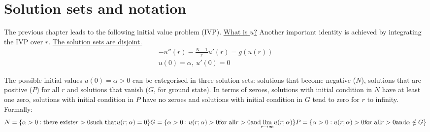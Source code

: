 \section{Solution sets and notation}\label{not}
The previous chapter leads to the following initial value problem (IVP). \underline{What is $u$?} Another important identity is achieved by integrating the IVP over $r$. \underline{The solution sets are disjoint.}
\begin{gather*}-u''(r)-\frac{N-1}{r}u'(r)=g(u(r))\tag{IVP}\label{ivp}\\ u(0)=\alpha,~u'(0)=0\end{gather*}
\begin{equation}\label{ivpint}
\end{equation}

The possible initial values $u(0)=\alpha>0$ can be categorised in three solution sets: solutions that become negative ($N$), solutions that are positive ($P$) for all $r$ and solutions that vanish ($G$, for ground state). In terms of zeroes, solutions with initial condition in $N$ have at least one zero, solutions with initial condition in $P$ have no zeroes and solutions with initial condition in $G$ tend to zero for $r$ to infinity. Formally:
\begin{equation*}
  N = \{\alpha>0: \text{there exists} r>0 \text{such that} u(r;\alpha)=0\} \\
  G = \{\alpha>0: u(r;\alpha)>0 \text{for all} r>0 \text{and} \underset{r\to\infty}{\lim}u(r;\alpha)\}\\
  P = \{\alpha>0: u(r;\alpha)>0 \text{for all} r>0 \text{and} \alpha\notin G\}
\end{equation*}
